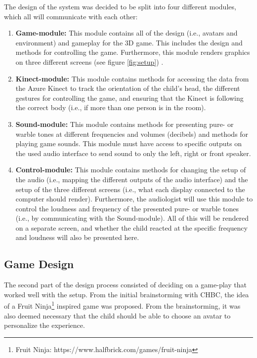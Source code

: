 The design of the system was decided to be split into four different modules, which all will communicate with each other: 

\begin{enumerate}
    \item \textbf{Game-module: } This module contains all of the design (i.e., avatars and environment) and gameplay for the 3D game. This includes the design and methods for controlling the game. Furthermore, this module renders graphics on three different screens (see figure \ref{fig:setup}) . 
    \item \textbf{Kinect-module: } This module contains methods for accessing the data from the Azure Kinect to track the orientation of the child's head, the different gestures for controlling the game, and ensuring that the Kinect is following the correct body (i.e., if more than one person is in the room).
    \item \textbf{Sound-module: } This module contains methods for presenting pure- or warble tones at different frequencies and volumes (decibels) and methods for playing game sounds. This module must have access to specific outputs on the used audio interface to send sound to only the left, right or front speaker.
    \item \textbf{Control-module: } This module contains methods for changing the setup of the audio (i.e., mapping the different outputs of the audio interface) and the setup of the three different screens (i.e., what each display connected to the computer should render). Furthermore, the audiologist will use this module to control the loudness and frequency of the presented pure- or warble tones (i.e., by communicating with the Sound-module). All of this will be rendered on a separate screen, and whether the child reacted at the specific frequency and loudness will also be presented here. 
\end{enumerate}

\subsection{Game Design} \label{gameDesign}

The second part of the design process consisted of deciding on a game-play that worked well with the setup. From the initial brainstorming with CHBC, the idea of a Fruit Ninja\footnote{Fruit Ninja: https://www.halfbrick.com/games/fruit-ninja} inspired game was proposed. From the brainstorming, it was also deemed necessary that the child should be able to choose an avatar to personalize the experience. \newline


